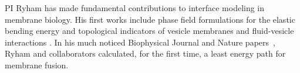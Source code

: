 PI Ryham has made fundamental contributions to interface modeling in
membrane biology.  His first works include
phase field formulations for the elastic bending energy \cite{0951-7715-18-3-016,Du05} and topological indicators \cite{DuEuler} of vesicle membranes
and fluid-vesicle interactions \cite{QiangDu09}.
In his much noticed Biophysical Journal
and Nature papers~\cite{RyKlYaCo16,Chetal16}, Ryham and collaborators 
calculated, for the first time, a least energy path for membrane fusion.  





